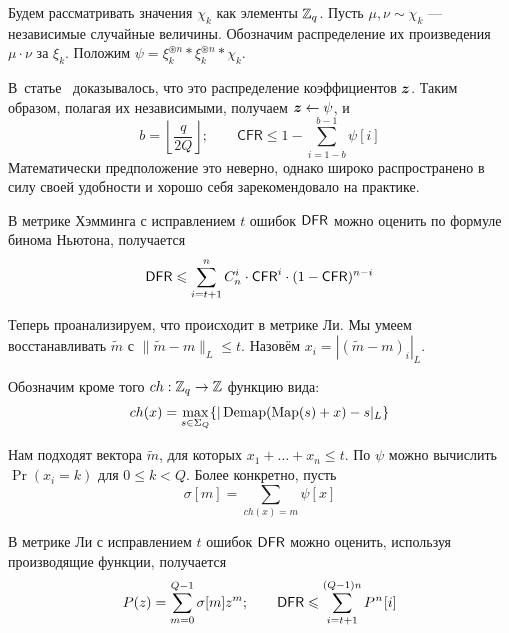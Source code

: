 Будем рассматривать значения $\chi_k$ как элементы $\Z_q$. Пусть $\mu, \nu \sim \chi_k$ --- независимые случайные величины. Обозначим распределение их произведения $\mu \cdot \nu$ за $\xi_k$. Положим $\psi = \xi_k^{\circledast n} * \xi_k^{\circledast n} * \chi_k$.

В~статье~\cite{RLWE_Channel} доказывалось, что это распределение коэффициентов $\bold z$. Таким образом, полагая их независимыми, получаем $\bold z \leftarrow \psi$, и
\begin{equation}
	b = \left\lfloor\frac{q}{2Q}\right\rfloor; \qquad \mathsf{CFR} \leq 1-\sum_{i=1-b}^{b-1}{\psi[i]}
\end{equation}
Математически предположение это неверно, однако широко распространено в силу своей удобности и хорошо себя зарекомендовало на практике.

\begin{state}\label{st:Ham}
	В метрике Хэмминга с исправлением $t$ ошибок $\DFR$ можно оценить по формуле бинома Ньютона, получается
	\begin{equation}
		\DFR \leq \sum_{i=t+1}^n{C_n^i\cdot\mathsf{CFR}^i\cdot(1-\mathsf{CFR})^{n-i}}
	\end{equation}
\end{state}

Теперь проанализируем, что происходит в метрике Ли. Мы умеем восстанавливать $\widetilde{m}$ с $\|\widetilde{m}-m\|_L \leq t$. Назовём $x_i = |(\widetilde{m}-m)_i|_L$.

Обозначим кроме того $ch: \Z_q \to \Z$ функцию вида:
\begin{equation}
	ch(x) = \max_{s \in \Sigma_Q}\{|\Demap(\Map(s)+x)-s|_L\}
\end{equation}

Нам подходят вектора $\widetilde{m}$, для которых $x_1+\ldots+x_n \leq t$. По $\psi$ можно вычислить $\Pr(x_i = k)$ для $0 \leq k < Q$. Более конкретно, пусть
\begin{equation}
\sigma[m] = \sum_{ch(x) = m}{\psi[x]}
\end{equation}

\begin{state}\label{st:Li}
	В метрике Ли с исправлением $t$ ошибок $\DFR$ можно оценить, используя производящие функции, получается
	\begin{equation}
		P(z) = \sum_{m=0}^{Q-1}{\sigma[m]z^m}; \qquad \DFR \leq \sum_{i=t+1}^{(Q-1)n}{P^{\?n}\?[i]}
	\end{equation}
\end{state}

